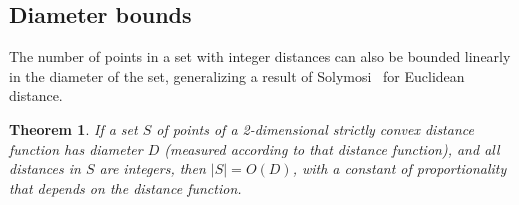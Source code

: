 \documentclass[11pt]{article}
\newtheorem{theorem}{Theorem}
\theoremstyle{definition}
\begin{document}
\subsection{Diameter bounds}

The number of points in a set with integer distances can also be bounded linearly in the diameter of the set, generalizing a result of Solymosi~\cite{Sol-DCG-03} for Euclidean distance.

\begin{theorem}
\label{thm:dist-fun-diam}
If a set $S$ of points of a 2-dimensional strictly convex distance function has diameter $D$ (measured according to that distance function), and all distances in $S$ are integers, then $|S|=O(D)$, with a constant of proportionality that depends on the distance function.
\end{theorem}
\end{document}
